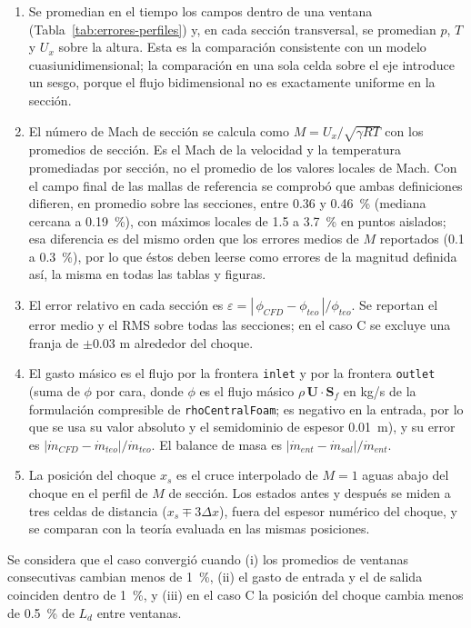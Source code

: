 \documentclass[12pt,letterpaper]{article}
\numberwithin{equation}{section}
\begin{document}
\begin{enumerate}
  \item Se promedian en el tiempo los campos dentro de una ventana (Tabla~\ref{tab:errores-perfiles}) y, en cada sección transversal, se promedian $p$, $T$ y $U_x$ sobre la altura. Esta es la comparación consistente con un modelo cuasiunidimensional; la comparación en una sola celda sobre el eje introduce un sesgo, porque el flujo bidimensional no es exactamente uniforme en la sección.
  \item El número de Mach de sección se calcula como $M=U_x/\sqrt{\gamma R T}$ con los promedios de sección. Es el Mach de la velocidad y la temperatura promediadas por sección, no el promedio de los valores locales de Mach. Con el campo final de las mallas de referencia se comprobó que ambas definiciones difieren, en promedio sobre las secciones, entre 0.36 y 0.46~\% (mediana cercana a 0.19~\%), con máximos locales de 1.5 a 3.7~\% en puntos aislados; esa diferencia es del mismo orden que los errores medios de $M$ reportados (0.1 a 0.3~\%), por lo que éstos deben leerse como errores de la magnitud definida así, la misma en todas las tablas y figuras.
  \item El error relativo en cada sección es $\varepsilon=|\,\phi_{CFD}-\phi_{teo}\,|/\phi_{teo}$. Se reportan el error medio y el RMS sobre todas las secciones; en el caso C se excluye una franja de $\pm 0.03$ m alrededor del choque.
  \item El gasto másico es el flujo por la frontera \texttt{inlet} y por la frontera \texttt{outlet} (suma de $\phi$ por cara, donde $\phi$ es el flujo másico $\rho\,\mathbf{U}\cdot\mathbf{S}_f$ en kg/s de la formulación compresible de \texttt{rhoCentralFoam}; es negativo en la entrada, por lo que se usa su valor absoluto y el semidominio de espesor 0.01~m), y su error es $|\dot m_{CFD}-\dot m_{teo}|/\dot m_{teo}$. El balance de masa es $|\dot m_{ent}-\dot m_{sal}|/\dot m_{ent}$.
  \item La posición del choque $x_s$ es el cruce interpolado de $M=1$ aguas abajo del choque en el perfil de $M$ de sección. Los estados antes y después se miden a tres celdas de distancia ($x_s\mp3\Delta x$), fuera del espesor numérico del choque, y se comparan con la teoría evaluada en las mismas posiciones.
\end{enumerate}

Se considera que el caso convergió cuando (i) los promedios de ventanas consecutivas cambian menos de 1~\%, (ii) el gasto de entrada y el de salida coinciden dentro de 1~\%, y (iii) en el caso C la posición del choque cambia menos de 0.5~\% de $L_d$ entre ventanas.
\end{document}
